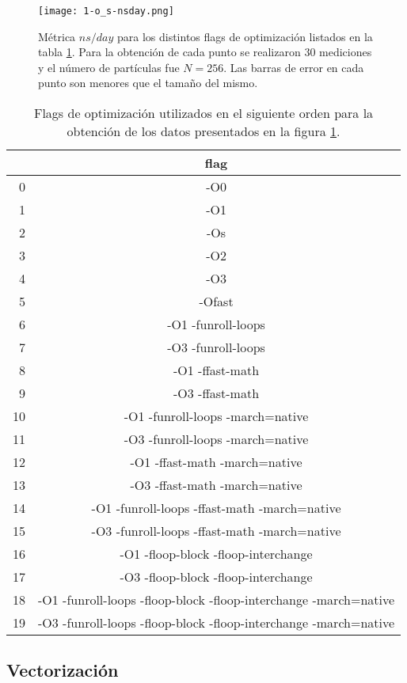 \documentclass[a4paper,spanish,12pt,twoside]{article}
\begin{document}
\begin{figure}[h]
	\centering
	\texttt{[image: 1-o\_s-nsday.png]}
	\caption{Métrica $ns/day$ para los distintos flags de optimización listados en la tabla \ref{tab:os-flags}. Para la obtención de cada punto se realizaron 30 mediciones y el número de partículas fue $N = 256$. Las barras de error en cada punto son menores que el tamaño del mismo.}
	\label{fig:os-nsday}
\end{figure}
\begin{table}[h]
	\centering
	\caption{Flags de optimización utilizados en el siguiente orden para la obtención de los datos presentados en la figura \ref{fig:os-nsday}.}
	\label{tab:os-flags}
	\begin{tabular}{|r|c|}
		\hline
	       & flag \\ \hline
		 0 & -O0  \\
		 1 & -O1  \\
		 2 & -Os  \\
		 3 & -O2  \\
		 4 & -O3  \\
		 5 & -Ofast \\
		 6 & -O1 -funroll-loops \\
		 7 & -O3 -funroll-loops \\
		 8 & -O1 -ffast-math \\
		 9 & -O3 -ffast-math \\
		10 & -O1 -funroll-loops -march=native \\
		11 & -O3 -funroll-loops -march=native \\
		12 & -O1 -ffast-math -march=native \\
		13 & -O3 -ffast-math -march=native \\
		14 & -O1 -funroll-loops -ffast-math -march=native \\
		15 & -O3 -funroll-loops -ffast-math -march=native \\
		16 & -O1 -floop-block -floop-interchange \\
		17 & -O3 -floop-block -floop-interchange \\
		18 & -O1 -funroll-loops -floop-block -floop-interchange -march=native \\
		19 & -O3 -funroll-loops -floop-block -floop-interchange -march=native \\
		\hline
	\end{tabular}
\end{table}


\subsection{Vectorización}
\end{document}
